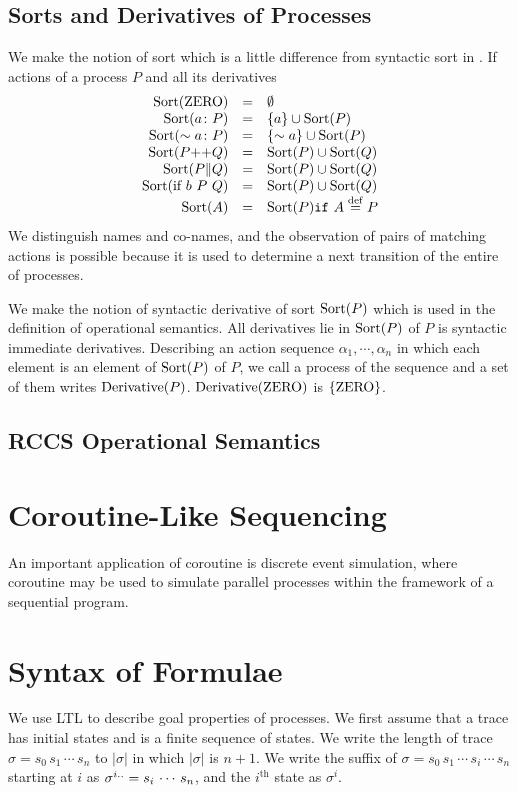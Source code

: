 \documentclass[12pt,a4paper,titlepage]{article}
\theoremstyle{break}
\begin{document}
\subsection{Sorts and Derivatives of Processes}
We make the notion of sort which is a little difference from syntactic sort in \cite{mil:book}.
If actions of a process \(P\) and all its derivatives
  \begin{displaymath}
    \begin{array}{rcl}
\sort{\ZERO}&=&\emptyset\\
\sort{a\colon P}&=&\{a\}\cup\sort{P}\\
\sort{\sim a\colon P}&=&\{\sim a\}\cup\sort{P}\\
\sort{P\mbox{++}Q}&=&\sort{P}\cup\sort{Q}\\
\sort{P\|Q}&=&\sort{P}\cup\sort{Q}\\
\sort{\mbox{if}\ b\ P\ Q}&=&\sort{P}\cup\sort{Q}\\
\sort{A}&=&\sort{P} \mbox{{\tt if} $A\procdef P$}
    \end{array}
  \end{displaymath}
We distinguish names and co-names, and the observation of pairs of matching actions is possible because it is used to determine a next transition of the entire of processes.

We make the notion of syntactic derivative of sort \(\sort{P}\) which is used in the definition of operational semantics.
All derivatives lie in \(\sort{P}\) of \(P\) is syntactic immediate derivatives.
Describing an action sequence \(\alpha_1,\cdots,\alpha_n\) in which each element is an element of \(\sort{P}\) of \(P\), we call a process of the sequence
 and a set of them writes \(\derivative{P}\).
\(\derivative{\ZERO}\) is \(\{\ZERO\}\).
\subsection{RCCS Operational Semantics}\label{sec:OPERATINAL_SEMANTICS}

\section{Coroutine-Like Sequencing}
An important application of coroutine is discrete event simulation, where coroutine may be used to simulate parallel processes within the framework of a sequential program.
\section{Syntax of Formulae}
We use LTL to describe goal properties of processes.
We first assume that a trace has initial states and is a finite sequence of states.
We write the length of trace \(\sigma=s_0\,s_1\,\cdots\,s_n\) to \(|\sigma|\) in which \(|\sigma|\) is \(n+1\).
We write the suffix of \(\sigma=s_0\,s_1\,\cdots\,s_i\,\cdots\,s_n\) starting at \(i\) as \(\suffix{\sigma}{i}=s_i\,\cdots\,s_n\), and the \(i^{\mbox{th}}\) state as \(\sigma^i\).
\end{document}
